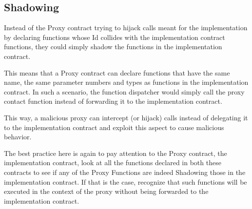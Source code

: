 \subsection{Shadowing}\label{shadowing}

Instead of the Proxy contract trying to hijack calls meant for the
implementation by declaring functions whose Id collides with the
implementation contract functions, they could simply shadow the
functions in the implementation contract.

This means that a Proxy contract can declare functions that have the
same name, the same parameter numbers and types as functions in the
implementation contract. In such a scenario, the function dispatcher
would simply call the proxy contact function instead of forwarding it to
the implementation contract.

This way, a malicious proxy can intercept (or hijack) calls instead of
delegating it to the implementation contract and exploit this aspect to
cause malicious behavior.

The best practice here is again to pay attention to the Proxy contract,
the implementation contract, look at all the functions declared in both
these contracts to see if any of the Proxy Functions are indeed
Shadowing those in the implementation contract. If that is the case,
recognize that such functions will be executed in the context of the
proxy without being forwarded to the implementation contract.
